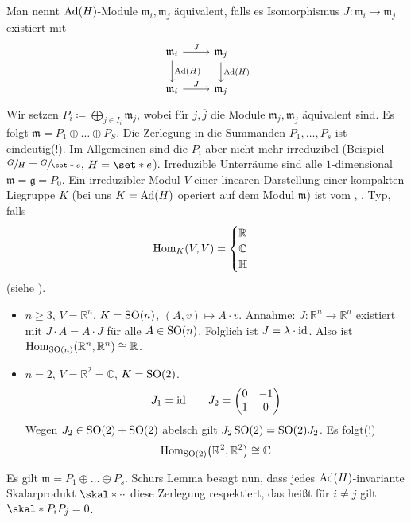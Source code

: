 Man nennt $\operatorname{Ad}(H)$-Module $\mathfrak{m}_i, \mathfrak{m}_j$ äquivalent, falls es Isomorphismus $J \colon \mathfrak{m}_i \to \mathfrak{m}_j$ existiert mit 
\[
	\begin{tikzcd}
		\mathfrak{m}_i\rar["J"] \dar["\Ad(H)"] & \mathfrak{m}_j \dar["\Ad(H)"] \\
		\mathfrak{m}_i \rar["J"] & \mathfrak{m}_j
 	\end{tikzcd}
\]
Wir setzen $P_i \coloneqq \bigoplus_{j \in I_i} \mathfrak{m}_j$, wobei für $j, \overline{j}$ die Module $\mathfrak{m}_j, \mathfrak{m}_{\overline{j}}$ äquivalent sind. 
Es folgt $\mathfrak{m} = P_1 \oplus \ldots \oplus P_S$.
Die Zerlegung in die  Summanden $P_1, \ldots , P_s$ ist eindeutig(!).
Im Allgemeinen sind die $P_i$ aber nicht mehr irreduzibel (Beispiel $\sfrac{G}{H} = \sfrac{G}{\set*{e}}$, $H = \set*{e}$).
Irreduzible Unterräume sind alle $1$-dimensional $\mathfrak{m} = \mathfrak{g} = P_0$.
Ein irreduzibler Modul $V$ einer linearen Darstellung einer kompakten Liegruppe $K$ (bei uns $K = \operatorname{Ad}(H)$ operiert auf dem Modul $\mathfrak{m}$) ist vom , ,  Typ, falls 
\[
	\operatorname{Hom}_K (V,V) = \begin{cases}
		\mathbb{R} &\\
		\mathbb{C} & \\
		\mathbb{H} &
	\end{cases}
\]
(siehe \cite{BrotD}).
\begin{beispiel*}
	\begin{itemize}
		\item $n \ge 3$, $V= \mathbb{R}^n$, $K= \operatorname{SO}(n)$, $(A,v) \mapsto A \cdot v$.
		Annahme: $J \colon \mathbb{R}^n \to \mathbb{R}^n$ existiert mit $J \cdot A = A \cdot J$ für alle $A \in \operatorname{SO}(n)$.
		Folglich ist $J = \lambda \cdot {\operatorname{id}}$. Also ist $\Hom_{\SO(n)} \enbrace*{\mathbb{R}^n,\mathbb{R}^n} \cong \mathbb{R}$.
		\item $n=2$, $V=\mathbb{R}^2 =\mathbb{C} $, $K=\operatorname{SO}(2)$.
		\[
			J_1 = {\operatorname{id}} \qquad J_2 = \begin{pmatrix}
				0 & -1 \\
				1 & 0
			\end{pmatrix}
		\]
		Wegen $J_2 \in  \operatorname{SO}(2) + \operatorname{SO}(2)$ abelsch gilt $J_2 \operatorname{SO}(2) = \operatorname{SO}(2) J_2$. Es folgt(!)
		\[
			\Hom_{\SO(2)} \enbrace*{\mathbb{R}^2,\mathbb{R}^2} \cong \mathbb{C}
		\]
	\end{itemize}
\end{beispiel*}

Es gilt $\mathfrak{m} = P_1 \oplus  \ldots \oplus P_s$. Schurs Lemma besagt nun, dass jedes $\operatorname{Ad}(H)$-invariante Skalarprodukt $\skal*{\cdot }{\cdot }$ diese Zerlegung respektiert, das heißt für $i\neq j$ gilt $\skal*{P_i}{P_j}=0$.

